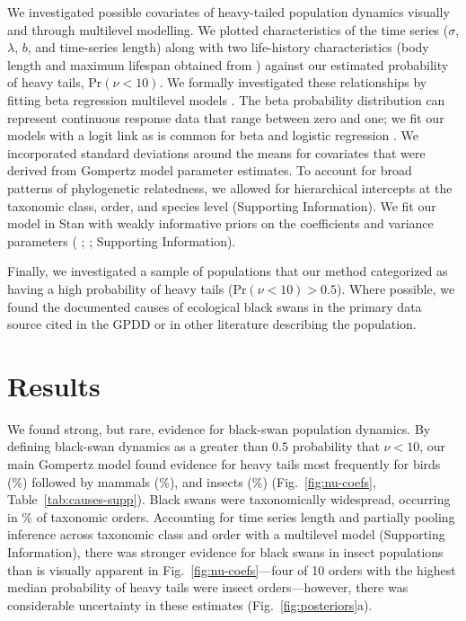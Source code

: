 We investigated possible covariates of heavy-tailed population dynamics
visually and through multilevel modelling. We plotted characteristics of the
time series ($\sigma$, $\lambda$, $b$, and time-series length) along with two
life-history characteristics (body length and maximum lifespan obtained from
\citet{brook2006a}) against our estimated probability of heavy tails, Pr$(\nu <
10)$. We formally investigated these relationships by fitting beta
regression multilevel models \citep{ferrari2004}. The beta probability
distribution can represent continuous response data that range between zero
and one; we fit our models with a logit link as is common for beta and logistic
regression \citep{ferrari2004}. We incorporated standard deviations around the
means for covariates that were derived from Gompertz model parameter
estimates. To account for broad patterns of phylogenetic relatedness, we
allowed for hierarchical intercepts at the taxonomic class, order, and species
level (Supporting Information). We fit our model in Stan with weakly
informative priors on the coefficients \citep{gelman2008d} and variance
parameters (\citeauthor{gelman2006c} \citeyear{gelman2006c};
\citeauthor{gelman2014} \citeyear{gelman2014}; Supporting Information).

Finally, we investigated a sample of populations that our method categorized as
having a high probability of heavy tails (Pr$(\nu < 10) > 0.5$). Where
possible, we found the documented causes of ecological black swans in the
primary data source cited in the GPDD or in other literature describing the
population.

\section{Results}

We found strong, but rare, evidence for black-swan population dynamics. By
defining black-swan dynamics as a greater than $0.5$ probability that $\nu <
10$, our main Gompertz model found evidence for heavy tails most frequently
for birds (\birdPH\%) followed by mammals (\mammalsPH\%), and insects
(\insectsPH\%) (Fig.~\ref{fig:nu-coefs}, Table~\ref{tab:causes-supp}). Black
swans were taxonomically widespread, occurring in \POrdersHeavy\% of taxonomic
orders. Accounting for time series length and partially pooling inference
across taxonomic class and order with a multilevel model (Supporting
Information), there was stronger evidence for black swans in insect
populations than is visually apparent in Fig.~\ref{fig:nu-coefs}---four of 10
orders with the highest median probability of heavy tails were insect
orders---however, there was considerable uncertainty in these estimates
(Fig.~\ref{fig:posteriors}a).

